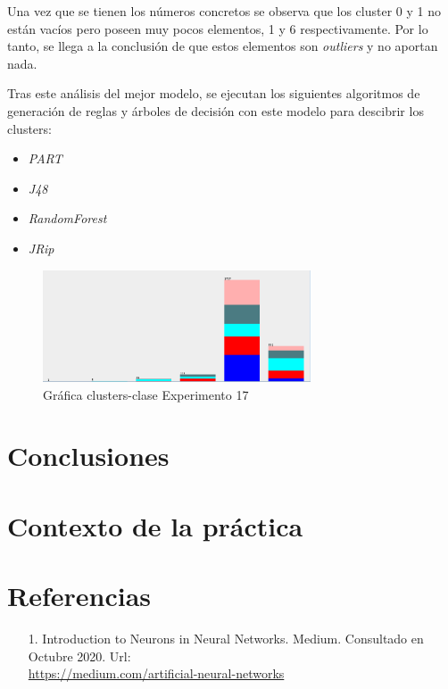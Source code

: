 \documentclass[12pt,a4paper, xcolor=table]{article}
\begin{document}
\newpage

Una vez que se tienen los números concretos se observa que los cluster 0 y 1 no están vacíos pero poseen muy pocos elementos, 1 y 6 respectivamente. Por lo tanto, se llega a la conclusión de que estos elementos son \textit{outliers} y no aportan nada.

\vspace{4mm}

Tras este análisis del mejor modelo, se ejecutan los siguientes algoritmos de generación de reglas y árboles de decisión con este modelo para descibrir los clusters:

\begin{itemize}
    \item \textit{PART}
    \item \textit{J48}
    \item \textit{RandomForest}
    \item \textit{JRip}
\end{itemize}


\begin{figure}[h]
    \centering
    \includegraphics[width=300px]{img/clusters_class.png}
    \caption{Gráfica clusters-clase Experimento 17}
    \label{fig:graf_exp1}
\end{figure}





\section{Conclusiones}

\section{Contexto de la práctica}


\clearpage

\section{Referencias}
    \begin{itemize}
        \item [1.] Introduction to Neurons in Neural Networks. Medium. Consultado en Octubre 2020. Url: \\
        \href{https://medium.com/artificial-neural-networks/introduction-to-neurons-in-neural-networks-71828d040a65}{https://medium.com/artificial-neural-networks}
    \end{itemize}
\printindex
\end{document}
